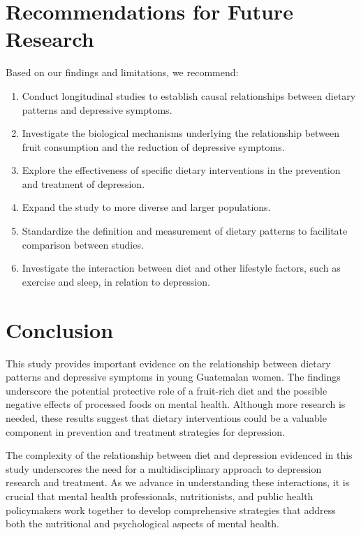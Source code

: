 \documentclass[jou]{apa7}
\begin{document}
\section{Recommendations for Future Research}\label{recomendaciones-para-futuras-investigaciones}

Based on our findings and limitations, we recommend:
\begin{enumerate}
	\item Conduct longitudinal studies to establish causal relationships between dietary patterns and depressive symptoms.
	\item Investigate the biological mechanisms underlying the relationship between fruit consumption and the reduction of depressive symptoms.
	\item Explore the effectiveness of specific dietary interventions in the prevention and treatment of depression.
	\item Expand the study to more diverse and larger populations.
	\item Standardize the definition and measurement of dietary patterns to facilitate comparison between studies.
	\item Investigate the interaction between diet and other lifestyle factors, such as exercise and sleep, in relation to depression.
\end{enumerate}

\section{Conclusion}\label{conclusiuxf3n}

This study provides important evidence on the relationship between dietary patterns and depressive symptoms in young Guatemalan women. The findings underscore the potential protective role of a fruit-rich diet and the possible negative effects of processed foods on mental health. Although more research is needed, these results suggest that dietary interventions could be a valuable component in prevention and treatment strategies for depression.

The complexity of the relationship between diet and depression evidenced in this study underscores the need for a multidisciplinary approach to depression research and treatment. As we advance in understanding these interactions, it is crucial that mental health professionals, nutritionists, and public health policymakers work together to develop comprehensive strategies that address both the nutritional and psychological aspects of mental health.






\printbibliography
\end{document}
